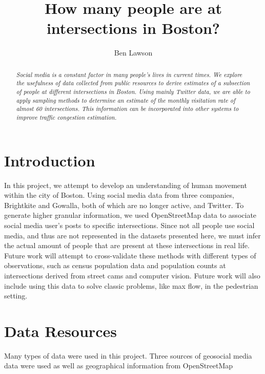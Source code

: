 \documentclass[twocolumn,10pt]{asme2ej}
\title{How many people are at intersections in Boston?}
\author{Ben Lawson
    \affiliation{
	Department of Computer Science\\
	Boston University\\
	Boston, Massachusetts 02215\\
        balawson@bu.edu 
    }	
}
\begin{document}
\maketitle    

\begin{abstract}
{\it Social media is a constant factor in many people's lives in current times. We explore the usefulness of data collected from public resources to derive estimates of a subsection of people at different intersections in Boston. Using mainly Twitter data, we are able to apply sampling methods to determine an estimate of the monthly visitation rate of almost 60 intersections. This information can be incorporated into other systems to improve traffic congestion estimation.
}
\end{abstract}


\section{Introduction}

In this project, we attempt to develop an understanding of human movement within the city of Boston. Using social media data from three companies, Brightkite and Gowalla, both of which are no longer active, and Twitter. To generate higher granular information, we used OpenStreetMap data to associate social media user's posts to specific intersections. Since not all people use social media, and thus are not represented in the datasets presented here, we must infer the actual amount of people that are present at these intersections in real life. Future work will attempt to cross-validate these methods with different types of observations, such as census population data and population counts at intersections derived from street cams and computer vision. Future work will also include using this data to solve classic problems, like max flow, in the pedestrian setting. 

\section{Data Resources}

Many types of data were used in this project. Three sources of geosocial media data were used as well as geographical information from OpenStreetMap
\end{document}
